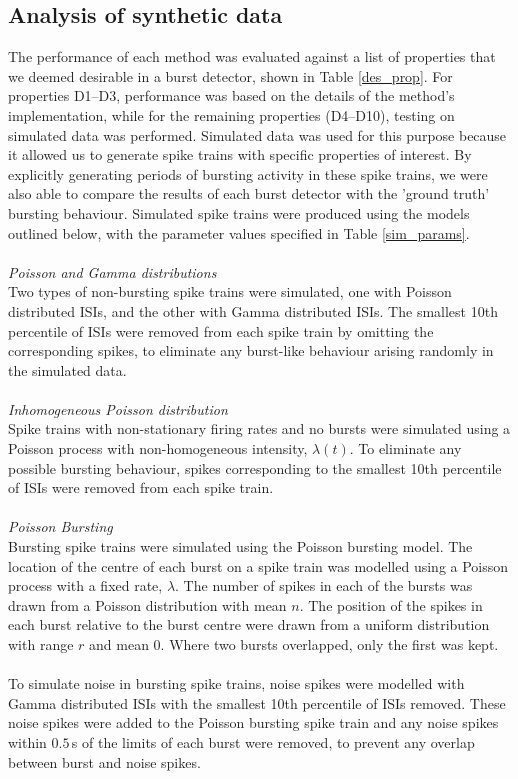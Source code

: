 \documentclass[12pt, titlepage]{article}
\begin{document}
	\subsection*{Analysis of synthetic data}
	The performance of each method was evaluated against a list of properties that we deemed desirable in a burst detector, shown in Table \ref{des_prop}. For properties D1--D3, performance was based on the details of the method's implementation, while for the remaining properties (D4--D10), testing on simulated data was performed. Simulated data was used for this purpose because it allowed us to generate spike trains with specific properties of interest. By explicitly generating periods of bursting activity in these spike trains, we were also able to compare the results of each burst detector with the 'ground truth' bursting behaviour. Simulated spike trains were produced using the models outlined below, with the parameter values specified in Table \ref{sim_params}.
	\\\\ 	\textit{Poisson and Gamma distributions}
	\\Two types of non-bursting spike trains were simulated, one with Poisson distributed ISIs, and the other with Gamma distributed ISIs. The smallest 10th percentile of ISIs were removed from each spike train by omitting the corresponding spikes, to eliminate any burst-like behaviour arising randomly in the simulated data.
	\\ \\  \textit{Inhomogeneous Poisson distribution}
	\\ Spike trains with non-stationary firing rates and no bursts were simulated using a Poisson process with non-homogeneous intensity, $\lambda(t)$. To eliminate any possible bursting behaviour, spikes corresponding to the smallest 10th percentile of ISIs were removed from each spike train.
	\\ \\  \textit{Poisson Bursting}
	\\ Bursting spike trains were simulated using the Poisson bursting model. The location of the centre of each burst on a spike train was modelled using a Poisson process with a fixed rate, $\lambda$. The number of spikes in each of the bursts was drawn from a Poisson distribution with mean $n$. The position of the spikes in each burst relative to the burst centre were drawn from a uniform distribution with range $r$ and mean 0. Where two bursts overlapped, only the first was kept. 
	\\ \\ To simulate noise in bursting spike trains, noise spikes were modelled with Gamma distributed ISIs with the smallest 10th percentile of ISIs removed. These noise spikes were added to the Poisson bursting spike train and any noise spikes within $0.5 \,$s of the limits of each burst were removed, to prevent any overlap between burst and noise spikes.
\end{document}
